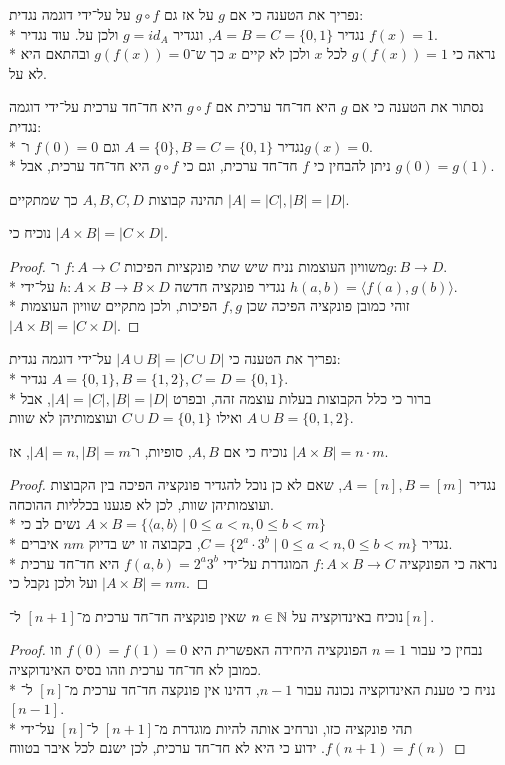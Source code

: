\Subquestion{}
נפריך את הטענה כי אם $g$ על אז גם $g \circ f$ על על־ידי דוגמה נגדית: \\*
נגדיר $A = B = C = \{0, 1\}$, ונגדיר $g = id_A$ ולכן על. עוד נגדיר $f(x) = 1$. \\*
נראה כי $g(f(x)) = 1$ לכל $x$ ולכן לא קיים $x$ כך ש־$g(f(x)) = 0$ ובהתאם היא לא על.

\Subquestion{}
נסתור את הטענה כי אם $g$ היא חד־חד ערכית אם $g \circ f$ היא חד־חד ערכית על־ידי דוגמה נגדית: \\*
נגדיר $A = \{0\}, B = C = \{0, 1\}$ וגם $f(0) = 0$ ו־$g(x) = 0$. \\*
ניתן להבחין כי $f$ חד־חד ערכית, וגם כי $g \circ f$ היא חד־חד ערכית, אבל $g(0) = g(1)$.

\Question{}
תהינה קבוצות $A, B, C, D$ כך שמתקיים $|A| = |C|, |B| = |D|$.

\Subquestion{}
נוכיח כי $|A \times B| = |C \times D|$.
\begin{proof}
	משוויון העוצמות נניח שיש שתי פונקציות הפיכות $f : A \to C$ ו־$g : B \to D$. \\*
	נגדיר פונקציה חדשה $h : A \times B \to B \times D$ על־ידי $h(a, b) = \langle f(a), g(b) \rangle$. \\*
	זוהי כמובן פונקציה הפיכה שכן $f, g$ הפיכות, ולכן מתקיים שוויון העוצמות $|A \times B| = |C \times D|$.
\end{proof}

\Subquestion{}
נפריך את הטענה כי $|A \cup B| = |C \cup D|$ על־ידי דוגמה נגדית: \\*
נגדיר $A = \{0, 1\}, B = \{1, 2\}, C = D = \{0, 1\}$. \\*
ברור כי כלל הקבוצות בעלות עוצמה זהה, ובפרט $|A| = |C|, |B| = |D|$, אבל $A \cup B = \{0, 1, 2\}$ ואילו $C \cup D = \{0, 1\}$ ועוצמותיהן לא שוות.

\Question{}
נוכיח כי אם $A, B$, סופיות, ו־$|A| = n, |B| = m$, אז $|A \times B| = n \cdot m$.
\begin{proof}
	נגדיר $A = [n], B = [m]$, שאם לא כן נוכל להגדיר פונקציה הפיכה בין הקבוצות ועוצמותיהן שוות, לכן לא פגענו בכלליות ההוכחה. \\*
	נשים לב כי $A \times B = \{ \langle a, b \rangle \mid 0 \le a < n, 0 \le b < m \}$ \\*
	נגדיר $C = \{ 2^a \cdot 3^b \mid 0 \le a < n, 0 \le b < m \}$, בקבוצה זו יש בדיוק $nm$ איברים. \\*
	נראה כי הפונקציה $f : A \times B \to C$ המוגדרת על־ידי $f(a, b) = 2^a 3^b$ היא חד־חד ערכית ועל ולכן נקבל כי $|A \times B| = nm$.
\end{proof}

\Question{}
\Subquestion{}
נוכיח באינדוקציה על $n \in \mathbb{N}$ שאין פונקציה חד־חד ערכית מ־$[n + 1]$ ל־$[n]$.
\begin{proof}
	נבחין כי עבור $n = 1$ הפונקציה היחידה האפשרית היא $f(0) = f(1) = 0$ וזו כמובן לא חד־חד ערכית וזהו בסיס האינדוקציה. \\*
	נניח כי טענת האינדוקציה נכונה עבור $n - 1$, דהינו אין פונקצה חד־חד ערכית מ־$[n]$ ל־$[n - 1]$. \\*
	תהי פונקציה כזו, ונרחיב אותה להיות מוגדרת מ־$[n + 1]$ ל־$[n]$ על־ידי $f(n + 1) = f(n)$. ידוע כי היא לא חד־חד ערכית, לכן ישנם לכל איבר בטווח 
\end{proof}



